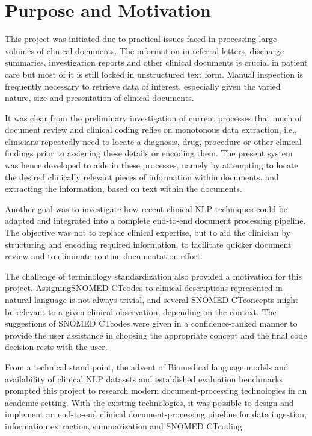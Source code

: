 \section{Purpose and Motivation}

This project was initiated due to practical issues faced in processing large volumes of clinical documents. The information in referral letters, discharge summaries, investigation reports and other clinical documents is crucial in patient care but most of it is still locked in unstructured text form. Manual inspection is frequently necessary to retrieve data of interest, especially given the varied nature, size and presentation of clinical documents.

It was clear from the preliminary investigation of current processes that much of document review and clinical coding relies on monotonous data extraction, i.e., clinicians repeatedly need to locate a diagnosis, drug, procedure or other clinical findings prior to assigning these details or encoding them. The present system was hence developed to aide in these processes, namely by attempting to locate the desired clinically relevant pieces of information within documents, and extracting the information, based on text within the documents.

Another goal was to investigate how recent clinical NLP techniques could be adapted and integrated into a complete end-to-end document processing pipeline. The objective was not to replace clinical expertise, but to aid the clinician by structuring and encoding required information, to facilitate quicker document review and to eliminate routine documentation effort.

The challenge of terminology standardization also provided a motivation for this project. AssigningSNOMED CTcodes to clinical descriptions represented in natural language is not always trivial, and several SNOMED CTconcepts might be relevant to a given clinical observation, depending on the context. The suggestions of SNOMED CTcodes were given in a confidence-ranked manner to provide the user assistance in choosing the appropriate concept and the final code decision rests with the user.

From a technical stand point, the advent of Biomedical language models and availability of clinical NLP datasets and established evaluation benchmarks prompted this project to research modern document-processing technologies in an academic setting. With the existing technologies, it was possible to design and implement an end-to-end clinical document-processing pipeline for data ingestion, information extraction, summarization and SNOMED CTcoding.

